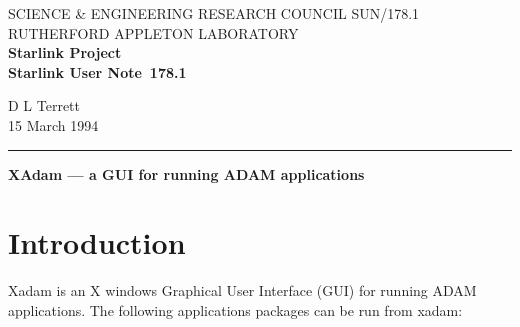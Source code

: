 \pagestyle{myheadings}

\newcommand{\stardoccategory}  {Starlink User Note}
\newcommand{\stardocinitials}  {SUN}
\newcommand{\stardocnumber}    {178.1}
\newcommand{\stardocauthors}   {D L Terrett}
\newcommand{\stardocdate}      {15 March 1994}
\newcommand{\stardoctitle}     {XAdam --- a GUI for running ADAM applications}

\newcommand{\stardocname}{\stardocinitials /\stardocnumber}
\renewcommand{\_}{{\tt\char'137}}     %
\markright{\stardocname}
\setlength{\textwidth}{160mm}
\setlength{\textheight}{230mm}
\setlength{\topmargin}{-2mm}
\setlength{\oddsidemargin}{0mm}
\setlength{\evensidemargin}{0mm}
\setlength{\parindent}{0mm}
\setlength{\parskip}{\medskipamount}
\setlength{\unitlength}{1mm}



\thispagestyle{empty}
SCIENCE \& ENGINEERING RESEARCH COUNCIL \hfill \stardocname\\
RUTHERFORD APPLETON LABORATORY\\
{\large\bf Starlink Project\\}
{\large\bf \stardoccategory\ \stardocnumber}
\begin{flushright}
\stardocauthors\\
\stardocdate
\end{flushright}
\vspace{-4mm}
\rule{\textwidth}{0.5mm}
\vspace{5mm}
\begin{center}
{\Large\bf \stardoctitle}
\end{center}
\vspace{5mm}


\section{Introduction}
Xadam is an X windows Graphical User Interface (GUI) for running ADAM
applications. The following applications packages can be run from xadam:

